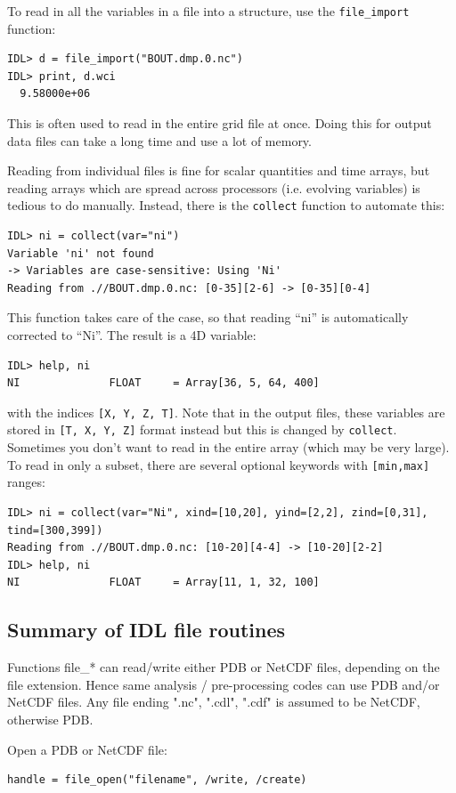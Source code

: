 \documentclass[12pt]{article}
\newcommand{\code}[1]{\texttt{#1}}
\begin{document}
To read in all the variables in a file into a structure, use the \code{file\_import} function:
\begin{verbatim}
IDL> d = file_import("BOUT.dmp.0.nc")
IDL> print, d.wci
  9.58000e+06
\end{verbatim}
This is often used to read in the entire grid file at once. Doing this for
output data files can take a long time and use a lot of memory.

Reading from individual files is fine for scalar quantities and time arrays, but reading arrays
which are spread across processors (i.e. evolving variables) is tedious
to do manually. Instead, there is the \code{collect} function to automate this:
\begin{verbatim}
IDL> ni = collect(var="ni")
Variable 'ni' not found
-> Variables are case-sensitive: Using 'Ni'
Reading from .//BOUT.dmp.0.nc: [0-35][2-6] -> [0-35][0-4]
\end{verbatim}
This function takes care of the case, so that reading ``ni'' is automatically corrected to ``Ni''. The result is a 4D variable:
\begin{verbatim}
IDL> help, ni
NI              FLOAT     = Array[36, 5, 64, 400]
\end{verbatim}
with the indices \code{[X, Y, Z, T]}. Note that in the output files,
these variables are stored in \code{[T, X, Y, Z]} format instead but
this is changed by \code{collect}.
Sometimes you don't want to read in the entire array (which may be very large). To read in only a subset, there are several optional keywords with \code{[min,max]}
ranges:
\begin{verbatim}
IDL> ni = collect(var="Ni", xind=[10,20], yind=[2,2], zind=[0,31], tind=[300,399])
Reading from .//BOUT.dmp.0.nc: [10-20][4-4] -> [10-20][2-2]
IDL> help, ni
NI              FLOAT     = Array[11, 1, 32, 100]
\end{verbatim}

\subsection{Summary of IDL file routines}

Functions file\_* can read/write either PDB or NetCDF
files, depending on the file extension. Hence same
analysis / pre-processing codes can use PDB and/or
NetCDF files. Any file ending ".nc", ".cdl", ".cdf"
is assumed to be NetCDF, otherwise PDB.

Open a PDB or NetCDF file:
\begin{verbatim}
handle = file_open("filename", /write, /create) 
\end{verbatim}
\end{document}
